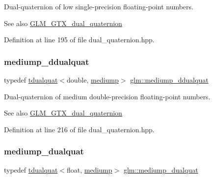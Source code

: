 Dual-\/quaternion of low single-\/precision floating-\/point numbers.

\begin{DoxySeeAlso}{See also}
\mbox{\hyperlink{group__gtx__dual__quaternion}{G\+L\+M\+\_\+\+G\+T\+X\+\_\+dual\+\_\+quaternion}} 
\end{DoxySeeAlso}


Definition at line 195 of file dual\+\_\+quaternion.\+hpp.

\mbox{\label{group__gtx__dual__quaternion_ga5727116ab20b2a1d40387766d723dd6c}} 
\subsubsection{\texorpdfstring{mediump\_ddualquat}{mediump\_ddualquat}}
{\footnotesize\ttfamily typedef \mbox{\hyperlink{structglm_1_1tdualquat}{tdualquat}}$<$double, \mbox{\hyperlink{namespaceglm_a0f04f086094c747d227af4425893f545a6416f3ea0c9025fb21ed50c4d6620482}{mediump}}$>$ \mbox{\hyperlink{group__gtx__dual__quaternion_ga5727116ab20b2a1d40387766d723dd6c}{glm\+::mediump\+\_\+ddualquat}}}

Dual-\/quaternion of medium double-\/precision floating-\/point numbers.

\begin{DoxySeeAlso}{See also}
\mbox{\hyperlink{group__gtx__dual__quaternion}{G\+L\+M\+\_\+\+G\+T\+X\+\_\+dual\+\_\+quaternion}} 
\end{DoxySeeAlso}


Definition at line 216 of file dual\+\_\+quaternion.\+hpp.

\mbox{\label{group__gtx__dual__quaternion_gaa88fe93eb823d1aba8d6df8028572cb5}} 
\subsubsection{\texorpdfstring{mediump\_dualquat}{mediump\_dualquat}}
{\footnotesize\ttfamily typedef \mbox{\hyperlink{structglm_1_1tdualquat}{tdualquat}}$<$float, \mbox{\hyperlink{namespaceglm_a0f04f086094c747d227af4425893f545a6416f3ea0c9025fb21ed50c4d6620482}{mediump}}$>$ \mbox{\hyperlink{group__gtx__dual__quaternion_gaa88fe93eb823d1aba8d6df8028572cb5}{glm\+::mediump\+\_\+dualquat}}}

